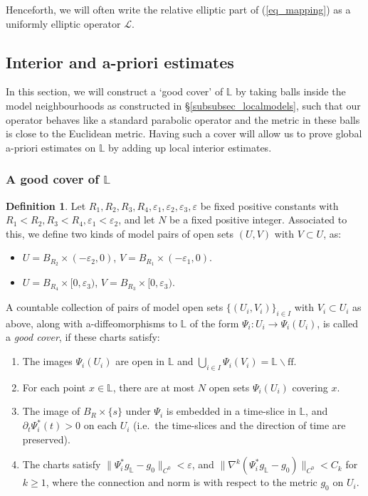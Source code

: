 \documentclass[10pt, a4paper]{article}
\theoremstyle{plain}%
\theoremstyle{definition}
\newtheorem{defn}[theorem]{Definition}
\numberwithin{figure}{section}
\numberwithin{equation}{section}
\newcommand{\bL}{\mathbb{L}}
\newcommand{\pa}{\partial}
\newcommand{\rt}{\rightarrow}
\newcommand{\ep}{\varepsilon}
\begin{document}
Henceforth, we will often write the relative elliptic part of (\ref{eq_mapping}) as a uniformly elliptic operator $\mathcal{L}$.


 
 
\subsection{Interior and a-priori estimates}
In this section, we will construct a `good cover' of $\bL$ by taking balls inside the model neighbourhoods as constructed in \S \ref{subsubsec_localmodels}, such that our operator behaves like a standard parabolic operator and the metric in these balls is close to the Euclidean metric. Having such a cover will allow us to prove global a-priori estimates on $\bL$ by adding up local interior estimates.

\subsubsection{A good cover of $\bL$}
\begin{defn}\label{def_goodcover}
    Let $R_1,R_2,R_3,R_4,\varepsilon_1,\ep_2,\ep_3,\ep$ be fixed positive constants with $R_1<R_2, R_3<R_4, \ep_1<\ep_2$, and let $N$ be a fixed positive integer. Associated to this, we define two kinds of model pairs of open sets $(U,V)$ with $V\subset U$, as:
    \begin{itemize}
    	\item $U=B_{R_2}\times (-\ep_2,0)$, $V=B_{R_1}\times (-\ep_1,0)$.
    	\item $U=B_{R_4}\times[0,\ep_3)$, $V=B_{R_3}\times[0,\ep_3)$.
    \end{itemize}
    
    A countable collection of pairs of model open sets $\{(U_i,V_i)\}_{i\in I}$ with $V_i\subset U_i$ as above, along with a-diffeomorphisms to $\bL$ of the form $\Psi_i: U_i\rt \Psi_i(U_i)$, is called a \textit{good cover}, if these charts satisfy:
\begin{enumerate}
	\item The images $\Psi_i(U_i)$ are open in $\bL$ and $\bigcup_{i\in I} \Psi_i(V_i)= \bL\backslash \textrm{ff}$. 
	\item For each point $x\in \bL$, there are at most $N$ open sets $\Psi_i(U_i)$ covering $x$.
 \item The image of $B_R\times\{s\}$ under $\Psi_i$ is embedded in a time-slice in $\bL$, and $\pa_t\Psi_i^*(t)>0$ on each $U_i$ (i.e.\ the time-slices and the direction of time are preserved).
    \item The charts satisfy $\|\Psi_i^*g_\bL-g_0\|_{C^0} < \varepsilon$, and $\|\nabla^k(\Psi_i^* g_\bL-g_0)\|_{C^0} < C_k$ for $k \geq 1$, where the connection and norm is with respect to the metric $g_0$ on $U_i$. 
 \end{enumerate}
\end{defn}
\end{document}
